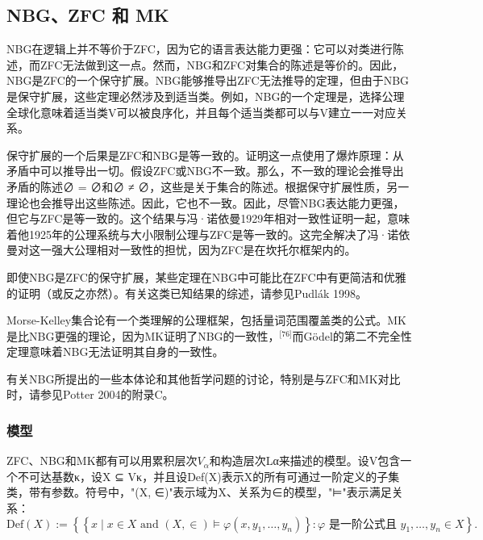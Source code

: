 \subsection{NBG、ZFC 和 MK}  
NBG在逻辑上并不等价于ZFC，因为它的语言表达能力更强：它可以对类进行陈述，而ZFC无法做到这一点。然而，NBG和ZFC对集合的陈述是等价的。因此，NBG是ZFC的一个保守扩展。NBG能够推导出ZFC无法推导的定理，但由于NBG是保守扩展，这些定理必然涉及到适当类。例如，NBG的一个定理是，选择公理全球化意味着适当类V可以被良序化，并且每个适当类都可以与V建立一一对应关系。

保守扩展的一个后果是ZFC和NBG是等一致的。证明这一点使用了爆炸原理：从矛盾中可以推导出一切。假设ZFC或NBG不一致。那么，不一致的理论会推导出矛盾的陈述∅ = ∅和∅ ≠ ∅，这些是关于集合的陈述。根据保守扩展性质，另一理论也会推导出这些陈述。因此，它也不一致。因此，尽管NBG表达能力更强，但它与ZFC是等一致的。这个结果与冯·诺依曼1929年相对一致性证明一起，意味着他1925年的公理系统与大小限制公理与ZFC是等一致的。这完全解决了冯·诺依曼对这一强大公理相对一致性的担忧，因为ZFC是在坎托尔框架内的。

即使NBG是ZFC的保守扩展，某些定理在NBG中可能比在ZFC中有更简洁和优雅的证明（或反之亦然）。有关这类已知结果的综述，请参见Pudlák 1998。

Morse-Kelley集合论有一个类理解的公理框架，包括量词范围覆盖类的公式。MK是比NBG更强的理论，因为MK证明了NBG的一致性，\(^\text{[76]}\)而Gödel的第二不完全性定理意味着NBG无法证明其自身的一致性。

有关NBG所提出的一些本体论和其他哲学问题的讨论，特别是与ZFC和MK对比时，请参见Potter 2004的附录C。
\subsubsection{模型}  
ZFC、NBG和MK都有可以用累积层次\(V_\alpha\)和构造层次Lα来描述的模型。设V包含一个不可达基数κ，设X ⊆ Vκ，并且设Def(X)表示X的所有可通过一阶定义的子集类，带有参数。符号中，"(X, ∈)"表示域为X、关系为∈的模型，"⊨"表示满足关系：
\[
\text{Def}(X) := \left\{ \left\{ x \mid x \in X \text{ and } (X, \in) \models \varphi(x, y_1, \ldots, y_n) \right\} : \varphi \text{ 是一阶公式且 } y_1, \ldots, y_n \in X \right\}.~
\]

